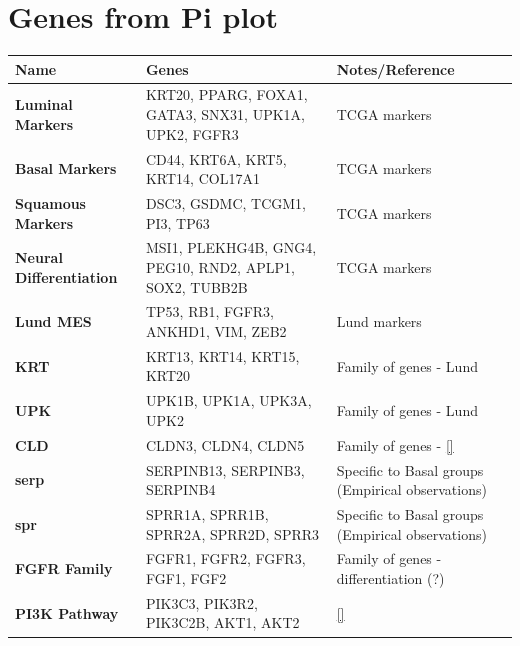 \section{Genes from Pi plot} \label{s:ap:pi_genes} 




\begin{table}[H]
    \centering
    \scriptsize
    \begin{tabularx}{\textwidth}{>{\hsize=0.6\hsize}X|>{\hsize=1.4\hsize}X|>{\hsize=1\hsize}X}
        \toprule
        \textbf{Name} & \textbf{Genes} & \textbf{Notes/Reference} \\
        \midrule
        \textbf{Luminal Markers} & KRT20, PPARG, FOXA1, GATA3, SNX31, UPK1A, UPK2, FGFR3 & TCGA markers \cite{Robertson2017-mg} \\
        \midrule
        \textbf{Basal Markers} & CD44, KRT6A, KRT5, KRT14, COL17A1 & TCGA markers \cite{Robertson2017-mg} \\
        \midrule
        \textbf{Squamous Markers} & DSC3, GSDMC, TCGM1, PI3, TP63 & TCGA markers \cite{Robertson2017-mg} \\
        \midrule
        \textbf{Neural Differentiation} & MSI1, PLEKHG4B, GNG4, PEG10, RND2, APLP1, SOX2, TUBB2B & TCGA markers \cite{Robertson2017-mg} \\
        \midrule
        \textbf{Lund MES} & TP53, RB1, FGFR3, ANKHD1, VIM, ZEB2 & Lund markers \cite{Marzouka2018-ge} \\
        \midrule
        \textbf{KRT} & KRT13, KRT14, KRT15, KRT20 & Family of genes - Lund \cite{Marzouka2018-ge}\\
        \midrule
        \textbf{UPK} & UPK1B, UPK1A, UPK3A, UPK2 & Family of genes - Lund \cite{Marzouka2018-ge}\\
        \midrule
        \textbf{CLD} & CLDN3, CLDN4, CLDN5 & Family of genes - \ref{}  \\
        \midrule
        \textbf{serp} & SERPINB13, SERPINB3, SERPINB4 & Specific to Basal groups (Empirical observations) \\
        \midrule
        \textbf{spr} & SPRR1A, SPRR1B, SPRR2A, SPRR2D, SPRR3 & Specific to Basal groups (Empirical observations) \\
        \midrule
        \textbf{FGFR Family} & FGFR1, FGFR2, FGFR3, FGF1, FGF2 & Family of genes - differentiation (?) \\
        \midrule
        \textbf{PI3K Pathway} & PIK3C3, PIK3R2, PIK3C2B, AKT1, AKT2 & \ref{} \\

\end{tabularx}
\end{table}
